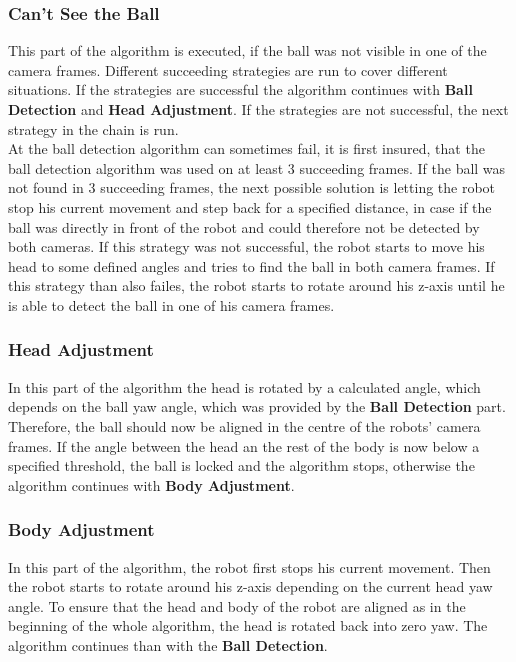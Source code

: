 \subsubsection{Can't See the Ball} 
This part of the algorithm is executed, if the ball was not visible in one of the camera frames. Different succeeding strategies are run to cover different situations. If the strategies are successful the algorithm continues with \textbf{Ball Detection} and \textbf{Head Adjustment}. If the strategies are not successful, the next strategy in the chain is run. \\
At the ball detection algorithm can sometimes fail, it is first insured, that 
the ball detection algorithm was used on at least 3 succeeding frames. If the ball was not found in 3 succeeding frames, the next possible solution is letting the robot stop his current movement and step back for a specified distance, in case if the ball was directly in front of the robot and could therefore not be detected by both cameras. If this strategy was not successful, the robot starts to move his head to some defined angles and tries to find the ball in both camera frames. If this strategy than also failes, the robot starts to rotate around his z-axis until he is able to detect the ball in one of his camera frames.

\subsubsection{Head Adjustment}
In this part of the algorithm the head is rotated by a calculated angle, which depends on the ball yaw angle, which was provided by the \textbf{Ball Detection} part.
Therefore, the ball should now be aligned in the centre of the robots' camera frames.
If the angle between the head an the rest of the body is now below a specified threshold, the ball is locked and the algorithm stops, otherwise the algorithm continues with \textbf{Body Adjustment}. 

\subsubsection{Body Adjustment}
In this part of the algorithm, the robot first stops his current movement. Then the robot starts to rotate around his z-axis depending on the current head yaw angle. To ensure that the head and body of the robot are aligned as in the beginning of the whole algorithm, the head is rotated back into zero yaw. The algorithm continues than with the \textbf{Ball Detection}.


